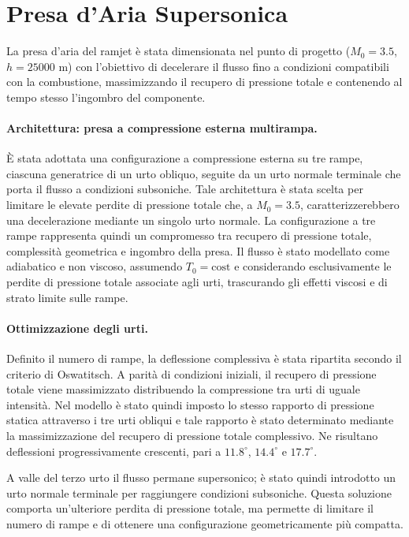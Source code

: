 \label{sec:presa_ramjet}
\section{Presa d'Aria Supersonica}

La presa d'aria del ramjet è stata dimensionata nel punto di progetto
($M_0=3.5$, $h=25000$ m) con l'obiettivo di decelerare il flusso fino a
condizioni compatibili con la combustione, massimizzando il recupero di
pressione totale e contenendo al tempo stesso l'ingombro del componente.

\paragraph{Architettura: presa a compressione esterna multirampa.}
È stata adottata una configurazione a compressione esterna su tre rampe,
ciascuna generatrice di un urto obliquo, seguite da un urto normale
terminale che porta il flusso a condizioni subsoniche. Tale architettura
è stata scelta per limitare le elevate perdite di pressione totale che,
a $M_0=3.5$, caratterizzerebbero una decelerazione mediante un singolo
urto normale. La configurazione a tre rampe rappresenta quindi un
compromesso tra recupero di pressione totale, complessità geometrica e
ingombro della presa. Il flusso è stato modellato come adiabatico e non
viscoso, assumendo $T_0=\mathrm{cost}$ e considerando esclusivamente le
perdite di pressione totale associate agli urti, trascurando gli effetti
viscosi e di strato limite sulle rampe.

\paragraph{Ottimizzazione degli urti.}
Definito il numero di rampe, la deflessione complessiva è stata ripartita
secondo il criterio di Oswatitsch. A parità di condizioni iniziali, il
recupero di pressione totale viene massimizzato distribuendo la
compressione tra urti di uguale intensità. Nel modello è stato quindi
imposto lo stesso rapporto di pressione statica attraverso i tre urti
obliqui e tale rapporto è stato determinato mediante la massimizzazione
del recupero di pressione totale complessivo. Ne risultano deflessioni
progressivamente crescenti, pari a $11.8^\circ$, $14.4^\circ$ e
$17.7^\circ$.

A valle del terzo urto il flusso permane supersonico; è stato quindi
introdotto un urto normale terminale per raggiungere condizioni
subsoniche. Questa soluzione comporta un'ulteriore perdita di pressione
totale, ma permette di limitare il numero di rampe e di ottenere una
configurazione geometricamente più compatta.

